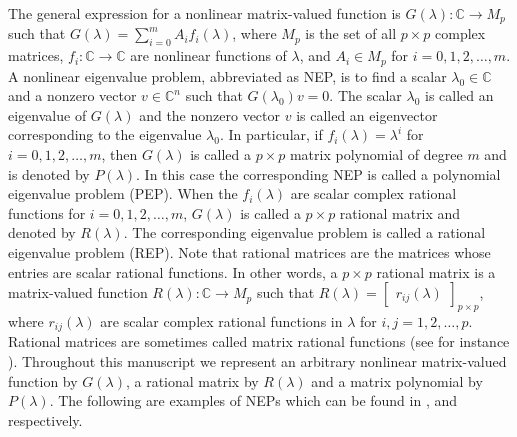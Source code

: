 \documentclass[12pt, reqno]{amsart}
\theoremstyle{definition}
\theoremstyle{remark}
\numberwithin{equation}{section}
\begin{document}
The general expression for a nonlinear matrix-valued function 
is $G(\lambda) \colon \mathbb{C} \to M_p$ such that $G(\lambda) = \displaystyle 
\sum_{i=0}^{m} A_i f_i(\lambda)$, where $M_p$ is the set of all $p \times p$ complex 
matrices, $f_i \colon \mathbb{C} \to \mathbb{C}$ are nonlinear functions of 
$\lambda$, and $A_i \in M_p$ for $i=0,1,2,\ldots,m$. A nonlinear eigenvalue 
problem, abbreviated as NEP, is to find a scalar $\lambda_0 \in \mathbb{C}$ 
and a nonzero vector $v \in \mathbb{C}^n$ such that $G(\lambda_0)v = 0$. The 
scalar $\lambda_0$ is called an eigenvalue of $G(\lambda)$ and the nonzero 
vector $v$ is called an eigenvector corresponding to the eigenvalue $\lambda_0$. 
In particular, if $f_i(\lambda) = \lambda^i$ for $i=0,1,2,\ldots,m$, then 
$G(\lambda)$ is called a $p \times p$ matrix polynomial of degree $m$ and is 
denoted by $P(\lambda)$. 
In this case the corresponding NEP is called a polynomial eigenvalue 
problem (PEP). When the $f_i(\lambda)$ are scalar complex rational functions for 
$i=0,1,2,\ldots,m$, $G(\lambda)$ is called a $p\times p$ rational matrix and 
denoted by $R(\lambda)$. The corresponding eigenvalue problem is called a rational 
eigenvalue problem (REP). Note that rational matrices are the matrices whose 
entries are scalar rational functions. In other words, a $p\times p$ rational 
matrix is a matrix-valued function $R(\lambda)\colon \mathbb{C} \to M_p$ such 
that $R(\lambda) = \begin{bmatrix}
r_{ij}(\lambda)
\end{bmatrix} _{p\times p}$, where $r_{ij}(\lambda)$ are scalar complex rational 
functions in $\lambda$ for $i,j=1,2,\ldots,p$. Rational matrices are sometimes 
called matrix rational functions (see for instance \cite{Su-Bai}). Throughout 
this manuscript we represent an arbitrary nonlinear matrix-valued function by 
$G(\lambda)$, a rational matrix by $R(\lambda)$ and a matrix polynomial by 
$P(\lambda)$. The following are examples of NEPs which can be found in 
\cite{Saad-Guide-Meidlar}, \cite{Su-Bai} 
and \cite{Betcke-Higham-Tisseur} respectively.
\end{document}
